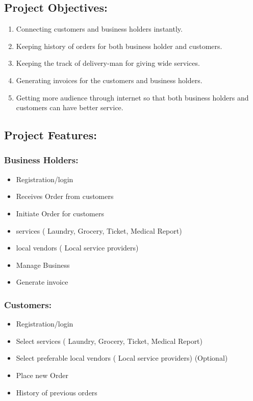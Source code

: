\documentclass[13pt]{extarticle}
\begin{document}
\subsection{Project Objectives:}
\begin{enumerate}
  \item Connecting customers and business holders instantly.
  \item Keeping history of orders for both business holder and customers.
  \item Keeping the track of delivery-man for giving wide services.
  \item Generating invoices for the customers and business holders.
  \item Getting more audience through internet so that both business holders and customers can have better service.
\end{enumerate}
\newpage
\subsection{Project Features:}
\subsubsection{Business Holders:}
\begin{itemize}
    \item Registration/login 
\item Receives Order from customers
\item Initiate Order for customers
\item services ( Laundry, Grocery, Ticket, Medical Report)
\item local vendors ( Local service providers)
\item Manage Business
 \item Generate invoice 
\end{itemize}
\subsubsection{Customers:}
\begin{itemize}
    \item Registration/login 
\item Select services ( Laundry, Grocery, Ticket, Medical Report)
\item Select preferable local vendors ( Local service providers) (Optional)
\item Place new Order
\item History of previous orders
\end{itemize}
\newpage
\end{document}

